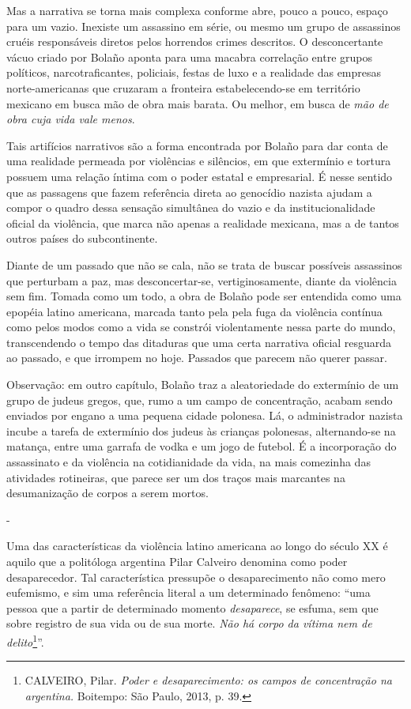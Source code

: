 Mas a narrativa se torna mais complexa conforme abre, pouco a pouco,
espaço para um vazio. Inexiste um assassino em série, ou mesmo um grupo
de assassinos cruéis responsáveis diretos pelos horrendos crimes
descritos. O desconcertante vácuo criado por Bolaño aponta para uma
macabra correlação entre grupos políticos, narcotraficantes, policiais,
festas de luxo e a realidade das empresas norte-americanas que cruzaram
a fronteira estabelecendo-se em território mexicano em busca mão de obra
mais barata. Ou melhor, em busca de \emph{mão de obra cuja vida vale
menos}.

Tais artifícios narrativos são a forma encontrada por Bolaño para dar
conta de uma realidade permeada por violências e silêncios, em que
extermínio e tortura possuem uma relação íntima com o poder estatal e
empresarial. É nesse sentido que as passagens que fazem referência
direta ao genocídio nazista ajudam a compor o quadro dessa sensação
simultânea do vazio e da institucionalidade oficial da violência, que
marca não apenas a realidade mexicana, mas a de tantos outros países do
subcontinente.

Diante de um passado que não se cala, não se trata de buscar possíveis
assassinos que perturbam a paz, mas desconcertar-se, vertiginosamente,
diante da violência sem fim. Tomada como um todo, a obra de Bolaño pode
ser entendida como uma epopéia latino americana, marcada tanto pela pela
fuga da violência contínua como pelos modos como a vida se constrói
violentamente nessa parte do mundo, transcendendo o tempo das ditaduras
que uma certa narrativa oficial resguarda ao passado, e que irrompem no
hoje. Passados que parecem não querer passar.

Observação: em outro capítulo, Bolaño traz a aleatoriedade do extermínio
de um grupo de judeus gregos, que, rumo a um campo de concentração,
acabam sendo enviados por engano a uma pequena cidade polonesa. Lá, o
administrador nazista incube a tarefa de extermínio dos judeus às
crianças polonesas, alternando-se na matança, entre uma garrafa de vodka
e um jogo de futebol. É a incorporação do assassinato e da violência na
cotidianidade da vida, na mais comezinha das atividades rotineiras, que
parece ser um dos traços mais marcantes na desumanização de corpos a
serem mortos.

-

Uma das características da violência latino americana ao longo do século
XX é aquilo que a politóloga argentina Pilar Calveiro denomina como
poder desaparecedor. Tal característica pressupõe o desaparecimento não
como mero eufemismo, e sim uma referência literal a um determinado
fenômeno: ``uma pessoa que a partir de determinado momento
\emph{desaparece}, se esfuma, sem que sobre registro de sua vida ou de
sua morte. \emph{Não há corpo da vítima nem de delito}\footnote{CALVEIRO,
  Pilar. \emph{Poder e desaparecimento: os campos de concentração na
  argentina.} Boitempo: São Paulo, 2013, p. 39.}''.

